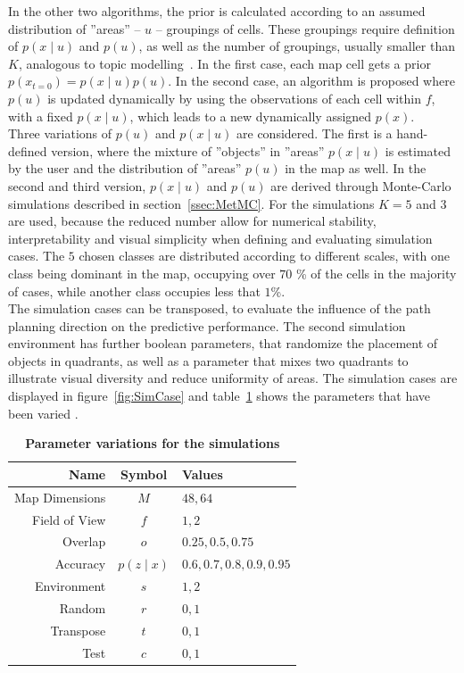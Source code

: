 \documentclass[twocolumn,letterpaper]{IEEEAerospaceCLS}  %
\begin{document}
In the other two algorithms, the prior is calculated according to an assumed distribution of ''areas'' -- $u$ -- groupings of cells. These groupings require definition of $p(x\mid u)$ and $p(u)$, as well as the number of groupings, usually smaller than $K$, analogous to topic modelling~\cite{blei_latent_2003}. In the first case, each map cell gets a prior $p(x_{t=0}) = p(x\mid u)p(u)$. In the second case, an algorithm is proposed where $p(u)$ is updated dynamically by using the observations of each cell within $f$, with a fixed $p(x\mid u)$, which leads to a new dynamically assigned $p(x)$.\\
Three variations of $p(u)$ and $p(x\mid u)$ are considered. The first is a hand-defined version, where the mixture of ''objects'' in ''areas'' $p(x\mid u)$ is estimated by the user and the distribution of ''areas'' $p(u)$ in the map as well. In the second and third version, $p(x\mid u)$ and $p(u)$ are derived through Monte-Carlo simulations described in section~\ref{ssec:MetMC}. For the simulations $K=5$ and $3$ are used, because the reduced number allow for numerical stability, interpretability and visual simplicity when defining and evaluating simulation cases. The $5$ chosen classes are distributed according to different scales, with one class being dominant in the map, occupying over $70$ \% of the cells in the majority of cases, while another class occupies less that $1$\%.\\
The simulation cases can be transposed, to evaluate the influence of the path planning direction on the predictive performance. The second simulation environment has further boolean parameters, that randomize the placement of objects in quadrants, as well as a parameter that mixes two quadrants to illustrate visual diversity and reduce uniformity of areas. The simulation cases are displayed in figure~\ref{fig:SimCase} and table~\ref{tab:params} shows the parameters that have been varied .
\begin{table}[]
    \renewcommand{\arraystretch}{1.3}
    \caption{\bf Parameter variations for the simulations}
    \label{tab:params}
    \centering
    \begin{tabular}{|r||c|l|}
        \hline
        \bfseries Name      & \bfseries Symbol & \bfseries Values       \\
        \hline \hline
        Map Dimensions & $M$ & $48, 64$\\
        \hline
        Field of View  & $f$              & $1, 2$ \\
        \hline
        Overlap     & $o$              & $0.25, 0.5, 0.75$         \\
        \hline
        Accuracy & $p(z\mid x)$              & $0.6, 0.7, 0.8, 0.9, 0.95$        \\
        \hline
        Environment & $s$& $1, 2$ \\
        \hline
        Random & $r$ & $0, 1$ \\
        \hline
        Transpose & $t$ & $0, 1$  \\
        \hline
        Test & $c$ & $0, 1$  \\
        \hline
    \end{tabular}
\end{table}
\end{document}
